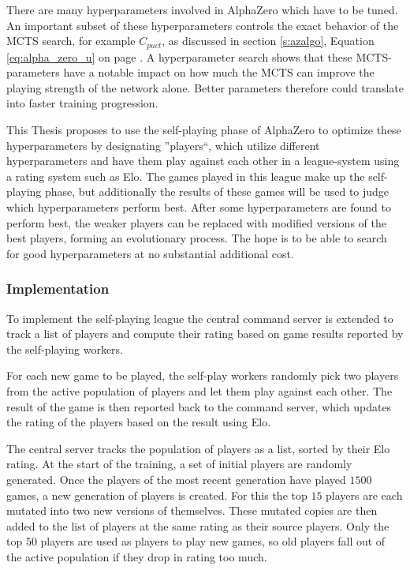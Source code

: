\documentclass[12pt,onecolumn,oneside,titlepage]{article}
\begin{document}
There are many hyperparameters involved in AlphaZero which have to be tuned. An important subset of these hyperparameters controls the exact behavior of the MCTS search, for example $C_{puct}$, as discussed in section \ref{s:azalgo}, Equation \ref{eq:alpha_zero_u} on page \pageref{eq:alpha_zero_u}.
A hyperparameter search shows that these MCTS-parameters have a notable impact on how much the MCTS can improve the playing strength of the network alone. Better parameters therefore could translate into faster training progression.

This Thesis proposes to use the self-playing phase of AlphaZero to optimize these hyperparameters by designating ''players``, which utilize different hyperparameters and have them play against each other in a league-system using a rating system such as Elo. The games played 
in this league make up the self-playing phase, but additionally the results of these games will be used to judge which hyperparameters perform best. After some hyperparameters are found to perform best, the weaker players can be replaced with modified versions 
of the best players, forming an evolutionary process. The hope is to be able to search for good hyperparameters at no substantial additional cost.

\subsubsection{Implementation}

To implement the self-playing league the central command server is extended to track a list of players and compute their rating based on game results reported by the self-playing workers.

For each new game to be played, the self-play workers randomly pick two players from the active population of players and let them play against each other. The result of the game is then reported back to the command server, which updates the rating of the players based on the result using Elo.

The central server tracks the population of players as a list, sorted by their Elo rating. 
At the start of the training, a set of initial players are randomly generated.
Once the players of the most recent generation have played $1500$ games, a new generation of players is created. For this the top $15$ players are each mutated into two new versions of themselves. These mutated copies are then added to the list of players at the same rating as their source players.
Only the top $50$ players are used as players to play new games, so old players fall out of the active population if they drop in rating too much.
\end{document}
